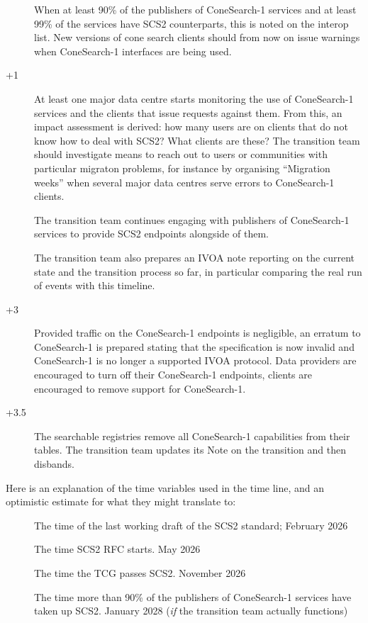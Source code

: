\documentclass[11pt,a4paper]{ivoa}
\begin{document}
\begin{description}
\item[] When at least 90\% of the publishers of ConeSearch-1
services and at least 99\% of the services have SCS2 counterparts, this
is noted on the interop list.  New versions of cone search clients
should from now on issue warnings when ConeSearch-1 interfaces are being
used.

\item[+1] At least one major data centre starts monitoring the
use of ConeSearch-1 services and the clients that issue requests against
them.  From this, an impact assessment is derived: how many users are on
clients that do not know how to deal with SCS2?  What clients are these?
The transition team should investigate means to reach out to users or
communities with particular migraton problems, for instance by
organising ``Migration weeks'' when several major data centres serve
errors to ConeSearch-1 clients.

The transition team continues engaging with publishers of ConeSearch-1
services to provide SCS2 endpoints alongside of them.

The transition team also prepares an IVOA note reporting on the current
state and the transition process so far, in particular comparing the
real run of events with this timeline.

\item[+3] Provided traffic on the ConeSearch-1 endpoints is
negligible, an erratum to ConeSearch-1 is prepared stating that the
specification is now invalid and ConeSearch-1 is no longer a supported
IVOA protocol.  Data providers are encouraged to turn off their
ConeSearch-1 endpoints, clients are encouraged to remove support for
ConeSearch-1.

\item[+3.5] The searchable registries remove all ConeSearch-1
capabilities from their tables.  The transition team updates its Note on
the transition and then disbands.

\end{description}

Here is an explanation of the time variables used in the time line, and
an optimistic estimate for what they might translate to:

\begin{description}
\item [] The time of the last working draft of the SCS2
standard; February 2026

\item[] The time SCS2 RFC starts.  May 2026

\item[] The time the TCG passes SCS2.  November 2026

\item[] The time more than 90\% of the publishers of
ConeSearch-1 services have taken up SCS2.  January 2028 (\textit{if} the
transition team actually functions)

\end{description}
\end{document}
